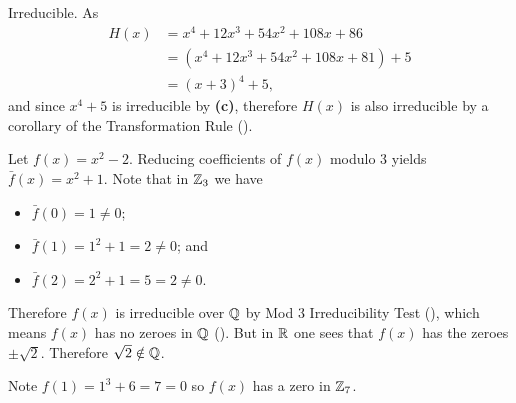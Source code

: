 \begin{questions}
\begin{partquestions}{\alph*}
        \item Irreducible. As
        \begin{align*}
            H(x) &= x^4 + 12x^3 + 54x^2 + 108x + 86\\
            &= (x^4 + 12x^3 + 54x^2 + 108x + 81) + 5\\
            &= (x+3)^4 + 5,
        \end{align*}
        and since $x^4 + 5$ is irreducible by \textbf{(c)}, therefore $H(x)$ is also irreducible by a corollary of the Transformation Rule ().
    \end{partquestions}

    \item Let $f(x) = x^2 - 2$. Reducing coefficients of $f(x)$ modulo 3 yields $\bar{f}(x) = x^2 + 1$. Note that in $\mathbb{Z}_3$ we have
    \begin{itemize}
        \item $\bar{f}(0) = 1 \neq 0$;
        \item $\bar{f}(1) = 1^2 + 1 = 2 \neq 0$; and
        \item $\bar{f}(2) = 2^2 + 1 = 5 = 2 \neq 0$.
    \end{itemize}
    Therefore $f(x)$ is irreducible over $\mathbb{Q}$ by Mod 3 Irreducibility Test (), which means $f(x)$ has no zeroes in $\mathbb{Q}$ (). But in $\mathbb{R}$ one sees that $f(x)$ has the zeroes $\pm\sqrt2$. Therefore $\sqrt2 \notin \mathbb{Q}$.

    \item \begin{partquestions}{\roman*}
        \item Note $f(1) = 1^3 + 6 = 7 = 0$ so $f(x)$ has a zero in $\mathbb{Z}_7$.
        

\end{partquestions}
\end{questions}
